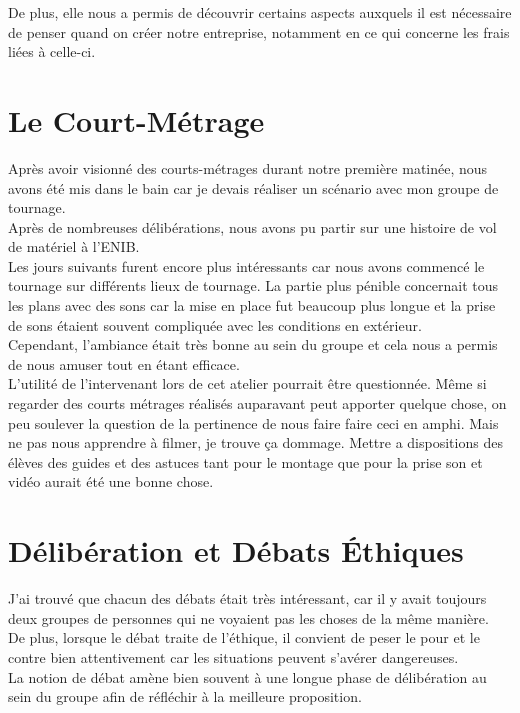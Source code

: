 {De plus, elle nous a permis de découvrir certains aspects auxquels il est nécessaire de penser quand on créer notre entreprise, notamment en ce qui concerne les frais liées à celle-ci.





\section{Le Court-Métrage}

Après avoir visionné des courts-métrages durant notre première matinée, nous avons été mis dans le bain car je devais réaliser un scénario avec mon groupe de tournage. \\ Après de nombreuses délibérations, nous avons pu partir sur une histoire de vol de matériel à l'ENIB.\\

Les jours suivants furent encore plus intéressants car nous avons commencé le tournage sur différents lieux de tournage. La partie plus pénible concernait tous les plans avec des sons car la mise en place fut beaucoup plus longue et la prise de sons étaient souvent compliquée avec les conditions en extérieur.\\
Cependant, l'ambiance était très bonne au sein du groupe et cela nous a permis de nous amuser tout en étant efficace.\\

L'utilité de l'intervenant lors de cet atelier pourrait être questionnée. Même si regarder des courts métrages réalisés auparavant peut apporter quelque chose, on peu soulever la question de la pertinence de nous faire faire ceci en amphi. Mais ne pas nous apprendre à filmer, je trouve ça dommage. Mettre a dispositions des élèves des guides et des astuces tant pour le montage que pour la prise son et vidéo aurait été une bonne chose.



\section{Délibération et Débats Éthiques}

J'ai trouvé que chacun des débats était très intéressant, car il y avait toujours deux groupes de personnes qui ne voyaient pas les choses de la même manière.\\


De plus, lorsque le débat traite de l'éthique, il convient de peser le pour et le contre bien attentivement car les situations peuvent s'avérer dangereuses.\\
La notion de débat amène bien souvent à une longue phase de délibération au sein du groupe afin de réfléchir à la meilleure proposition. \\

}
